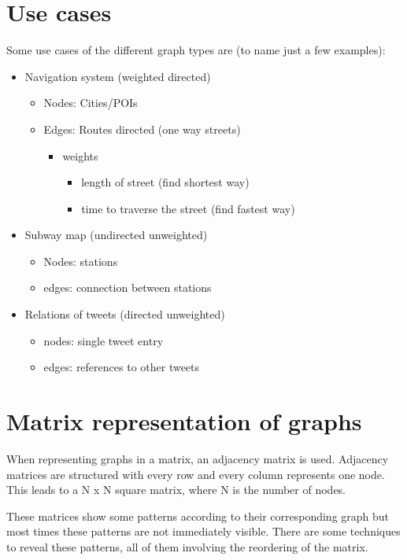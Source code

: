 \section{Use cases}
Some use cases of the different graph types are (to name just a few examples):
\begin{itemize}
\item Navigation system (weighted directed)
	\begin{itemize}
		\item Nodes: Cities/POIs
		\item Edges: Routes directed (one way streets)
		\begin{itemize}
			\item weights
			\begin{itemize}
				\item length of street (find shortest way)
				\item time to traverse the street (find fastest way)
			\end{itemize}		
		\end{itemize}
	\end{itemize}		
\item Subway map (undirected unweighted)
\begin{itemize}
	\item Nodes: stations
	\item edges: connection between stations
\end{itemize}
\item Relations of tweets (directed unweighted)
\begin{itemize}
	\item nodes: single tweet entry
	\item edges: references to other tweets
\end{itemize}
\end{itemize}


\section{Matrix representation of graphs}

When representing graphs in a matrix, an adjacency matrix is used. Adjacency matrices are structured with every row and every column represents one node. This leads to a N x N square matrix, where N is the number of nodes. 

These matrices show some patterns according to their corresponding graph but most times these patterns are not immediately visible. There are some techniques to reveal these patterns, all of them involving the reordering of the matrix.


